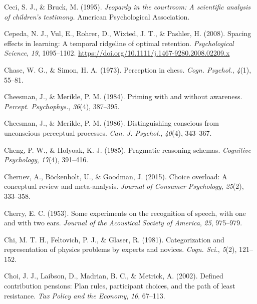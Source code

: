 \documentclass[
]{krantz}
\newlength{\cslhangindent}
\newlength{\cslentryspacingunit} %
\newenvironment{CSLReferences}[2] %
 {%
  \setlength{\parindent}{0pt}
  \ifodd #1
  \let\oldpar\par
  \def\par{\hangindent=\cslhangindent\oldpar}
  \fi
  \setlength{\parskip}{#2\cslentryspacingunit}
 }%
 {}
\begin{document}
\begin{CSLReferences}{1}{0}
\leavevmode{}%
Ceci, S. J., \& Bruck, M. (1995). \emph{Jeopardy in the courtroom: A scientific analysis of children's testimony.} American Psychological Association.

\leavevmode{}%
Cepeda, N. J., Vul, E., Rohrer, D., Wixted, J. T., \& Pashler, H. (2008). Spacing effects in learning: A temporal ridgeline of optimal retention. \emph{Psychological Science}, \emph{19}, 1095--1102. \url{https://doi.org/10.1111/j.1467-9280.2008.02209.x}

\leavevmode{}%
Chase, W. G., \& Simon, H. A. (1973). Perception in chess. \emph{Cogn. Psychol.}, \emph{4}(1), 55--81.

\leavevmode{}%
Cheesman, J., \& Merikle, P. M. (1984). Priming with and without awareness. \emph{Percept. Psychophys.}, \emph{36}(4), 387--395.

\leavevmode{}%
Cheesman, J., \& Merikle, P. M. (1986). Distinguishing conscious from unconscious perceptual processes. \emph{Can. J. Psychol.}, \emph{40}(4), 343--367.

\leavevmode{}%
Cheng, P. W., \& Holyoak, K. J. (1985). Pragmatic reasoning schemas. \emph{Cognitive Psychology}, \emph{17}(4), 391--416.

\leavevmode{}%
Chernev, A., Böckenholt, U., \& Goodman, J. (2015). Choice overload: A conceptual review and meta-analysis. \emph{Journal of Consumer Psychology}, \emph{25}(2), 333--358.

\leavevmode{}%
Cherry, E. C. (1953). Some experiments on the recognition of speech, with one and with two ears. \emph{Journal of the Acoustical Society of America}, \emph{25}, 975--979.

\leavevmode{}%
Chi, M. T. H., Feltovich, P. J., \& Glaser, R. (1981). Categorization and representation of physics problems by experts and novices. \emph{Cogn. Sci.}, \emph{5}(2), 121--152.

\leavevmode{}%
Choi, J. J., Laibson, D., Madrian, B. C., \& Metrick, A. (2002). Defined contribution pensions: Plan rules, participant choices, and the path of least resistance. \emph{Tax Policy and the Economy}, \emph{16}, 67--113.


\end{CSLReferences}
\end{document}
